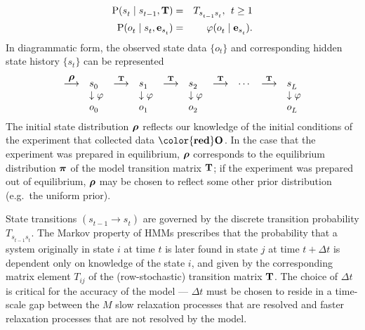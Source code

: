 \documentclass[aps,pre,twocolumn,superscriptaddress,nofootinbib,longbibliography]{revtex4-1}
\newcommand{\bfv}[1]{{\mbox{\boldmath{$#1$}}}}
\newcommand{\bfm}[1]{{\bf #1}}
\renewcommand{\Pr}{\mathrm{P}}
\begin{document}
{\begin{eqnarray}
\Pr(s^{}_t \mid s^{}_{t-1}, \bfm{T}) &=& T_{s^{}_{t-1} s^{}_{t}} , \:\: t \ge 1 \nonumber \\
\Pr(o^{}_t \mid s^{}_t, \bfm{e}_{s^{}_{t}}) &=& \varphi(o^{}_{t} \mid \bfm{e}_{s^{}_{t}}) \label{equation:hmm-process} .
\end{eqnarray}
In diagrammatic form, the observed state data $\{o_t\}$ and corresponding hidden state history $\{s_t\}$ can be represented 
\begin{eqnarray}
\begin{array}{llllllllll}
 \stackrel{\bfv{\rho}}{\longrightarrow} & s^{}_{0} & \stackrel{\bfm{T}}{\longrightarrow} & s^{}_{1} & \stackrel{\bfm{T}}{\longrightarrow} & s^{}_{2} & \stackrel{\bfm{T}}{\longrightarrow} & \cdots & \stackrel{\bfm{T}}{\longrightarrow} & s^{}_{L^{}} \\
 & \downarrow \varphi &  & \downarrow \varphi & & \downarrow \varphi & & & & \downarrow \varphi \\
 & o^{}_{0} & & o^{}_{1} & & o^{}_{2} &  & & & o^{}_{L^{}} \\
\end{array}
\end{eqnarray} 
The initial state distribution $\bfv{\rho}^{}$  reflects our knowledge of the initial conditions of the experiment that collected data $\bfm{{\color{red} O}}^{}$.
In the case that the experiment was prepared in equilibrium, $\bfv{\rho}$ corresponds to the equilibrium distribution $\bfv{\pi}$ of the model transition matrix $\bfm{T}$; if the experiment was prepared out of equilibrium, $\bfv{\rho}$ may be chosen to reflect some other prior distribution (e.g.~the uniform prior).

State transitions $(s^{}_{t-1} \rightarrow s^{}_{t})$ are governed by the discrete transition probability $T_{s^{}_{t-1} s^{}_{t}}$.
The Markov property of HMMs prescribes that the probability that a system originally in state $i$ at time $t$ is later found in state $j$ at time $t+\Delta t$ is dependent only on knowledge of the state $i$, and given by the corresponding matrix element $T_{ij}$ of the (row-stochastic) transition matrix $\bfm{T}$.
{\color{magenta}The choice of $\Delta t$ is critical for the accuracy of the model \cite{NoeEtAl_PMMHMM_JCP13} --- $\Delta t$ must
be chosen to reside in a time-scale gap between the $M$ slow relaxation processes that are resolved and faster relaxation
processes that are not resolved by the model.}

}
\end{document}

